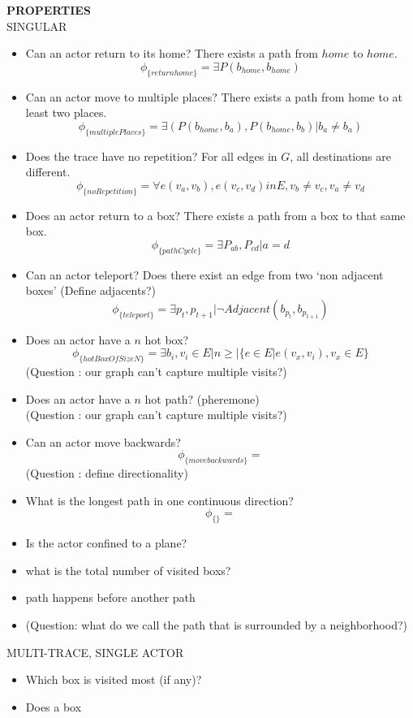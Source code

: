 \documentclass{article}
\begin{document}
\newpage
\textbf{PROPERTIES}\\
SINGULAR\\
\begin{itemize}
\item Can an actor return to its home?  There exists a path from $home$ to $home$.  
  $$\phi_{\{returnhome\}} = \exists P(b_{home}, b_{home})$$
\item Can an actor move to multiple places? There exists a path from home to at least two places.
  $$\phi_{\{multiplePlaces\}} = \exists (P(b_{home}, b_a), P(b_{home}, b_b)| b_a \neq b_a)$$

\item Does the trace have no repetition? For all edges in $G$, all destinations are different.
  $$\phi_{\{noRepetition\}} = \forall e(v_a, v_b), e(v_c,v_d) in E, v_b \neq v_c, v_a \neq v_d$$

\item Does an actor return to a box? There exists a path from a box to that same box.
  $$\phi_{\{pathCycle\}} = \exists P_{ab}, P_{cd} | a = d$$
\item Can an actor teleport? Does there exist an edge from two `non adjacent boxes'  (Define adjacents?)
  $$\phi_{\{teleport\}} = \exists  p_t, p_{t+1} | \lnot Adjacent(b_{p_t}, b_{p_{t+1}})$$
\item Does an actor have a $n$ hot box? 
  $$\phi_{\{hotBoxOfSizeN\}} = \exists b_i, v_i \in E | n \geq |\{e \in E | e(v_x, v_i), v_x \in E\}$$
  (Question : our graph can't capture multiple visits?)
\item Does an actor have a $n$ hot path? (pheremone)\\
  (Question : our graph can't capture multiple visits?)
\item Can an actor move backwards?
  $$\phi_{\{movebackwards\}} = $$
  (Question : define directionality)
\item What is the longest path in one continuous direction?
  $$\phi_{\{\}} = $$
\item Is the actor confined to a plane?
\item what is the total number of visited boxs?
\item path happens before another path
\item (Question: what do we call the path that is surrounded by a neighborhood?)
\end{itemize}

MULTI-TRACE, SINGLE ACTOR\\
\begin{itemize}
  \item Which box is visited most (if any)?
  \item Does a box 
\end{itemize}
\end{document}
